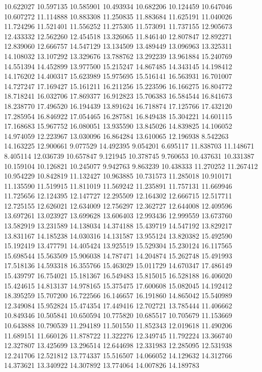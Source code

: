 10.622027
10.597135
10.585901
10.493934
10.682206
10.124459
10.647046
10.607272
11.114888
10.883308
11.250835
11.883684
11.625191
11.040026
11.724296
11.521401
11.556252
11.275305
11.573091
11.737155
12.905673
12.433332
12.562260
12.454518
13.326065
11.846140
12.807847
12.892271
12.839060
12.666757
14.547129
13.134509
13.489449
13.096963
13.325311
14.108032
13.107292
13.329676
13.788762
13.292239
13.961884
15.240769
14.551394
14.452899
13.977500
15.215247
14.867485
14.343145
14.198412
14.176202
14.400317
15.623989
15.975695
15.516141
16.563931
16.701007
14.727247
17.169427
15.161211
16.211256
15.223596
16.166275
16.804772
18.718241
16.032706
17.869377
16.912823
15.706383
16.584544
16.841673
18.238770
17.496520
16.194439
13.891624
16.718874
17.125766
17.432120
17.285954
16.846922
17.054465
16.287581
16.849438
15.304221
14.601115
17.168683
15.967752
16.080051
13.935590
13.845026
14.839825
14.106052
14.974059
12.223967
13.030096
16.864284
13.610065
12.196938
8.542263
14.163225
12.900661
9.077529
14.492395
9.054201
6.695117
11.838703
11.148671
8.405114
12.036739
10.657847
9.121945
10.378745
9.760653
10.437631
10.331387
10.159104
10.126821
10.245077
9.942763
9.863239
10.438333
11.270252
11.267412
10.954229
10.842819
11.132427
10.963885
10.731573
11.285018
10.910171
11.135590
11.519915
11.811019
11.569242
11.235891
11.757131
11.669946
11.725656
12.124395
12.147727
12.295509
12.164302
12.666715
12.517711
12.725155
12.626021
12.634009
12.756297
12.362727
12.644008
12.409596
13.697261
13.023927
13.699628
13.606403
12.993436
12.999559
13.673760
13.582919
13.231589
14.138034
14.374188
15.439719
14.547192
13.829217
13.831167
14.185238
14.030316
14.131587
13.955124
13.820382
15.492590
15.192419
13.477791
14.405424
13.925519
15.529304
15.230124
16.117565
15.698544
15.563509
15.906038
14.787471
14.204874
15.262748
15.491993
17.518136
14.593318
16.355766
15.463029
15.011729
14.670347
17.486149
15.439797
16.754021
15.181367
16.549483
15.815015
16.528188
16.406020
15.424615
14.813137
14.978165
15.375475
17.600608
15.082045
14.192412
18.395259
15.707200
16.722566
16.146657
16.191860
14.865042
15.540989
12.349084
15.952824
15.474354
17.449416
12.702721
13.785444
11.406662
10.849346
10.505841
10.650594
10.775820
10.685517
10.705679
11.153669
10.643888
10.790539
11.294189
11.501550
11.852343
12.019618
11.490206
11.689151
11.660126
11.878722
11.322276
12.349745
11.792224
13.366740
12.327807
13.425699
13.296514
12.644698
12.331983
12.285095
12.531938
12.241706
12.521812
13.774337
15.516507
14.066052
14.129632
14.312766
14.373621
13.340922
14.307892
13.774064
14.007826
14.189783
